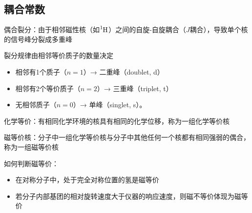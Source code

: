 \subsection{耦合常数}%
\label{sub:耦合常数}
\begin{defi}
    偶合裂分：由于相邻磁性核（如$\ce{^1H}$）之间的自旋-自旋耦合（$J$耦合），导致单个核的信号峰分裂成多重峰
\end{defi}
\begin{eg}
    裂分规律由相邻等价质子的数量决定
    \begin{itemize}
        \item 相邻有1个质子（$n=1$）→ 二重峰（doublet, d）
        \item 相邻有2个等价质子（$n=2$）→ 三重峰（triplet, t）
        \item 无相邻质子（$n=0$）→ 单峰（singlet, s）。
        
    \end{itemize}
\end{eg}
\begin{defi}
    化学等价：有相同化学环境的核具有相同的化学位移，称为一组化学等价核
\end{defi}
\begin{defi}
    磁等价核：分子中一组化学等价核与分子中其他任何一个核都有相同强弱的偶合，称为一组磁等价核
\end{defi}
如何判断磁等价：
\begin{itemize}
    \item 在对称分子中，处于完全对称位置的氢是磁等价
    \item 若分子内部基团的相对旋转速度大于仪器的响应速度，则磁不等价体现为磁等价
\end{itemize}
    
